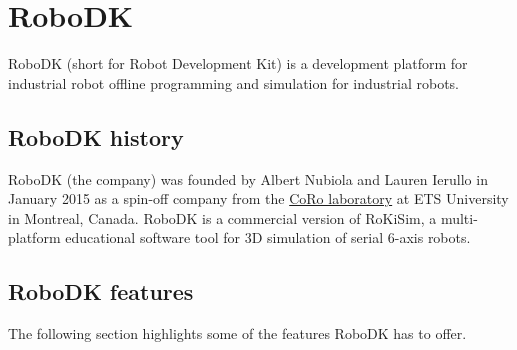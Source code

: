 \section{RoboDK}

RoboDK (short for Robot Development Kit) is a development platform for industrial robot offline programming and simulation for industrial robots.

\subsection{RoboDK history}

RoboDK (the company) was founded by Albert Nubiola and Lauren Ierullo in January 2015 as a spin-off company from the \href{https://en.etsmtl.ca/unites-de-recherche/coro/accueil?lang=en-CA}{CoRo laboratory}   at ETS University in Montreal, Canada. RoboDK is a commercial version of RoKiSim, a multi-platform educational software tool for 3D simulation of serial 6-axis robots.

\subsection{RoboDK features}


The following section highlights some of the features RoboDK has to offer. 


